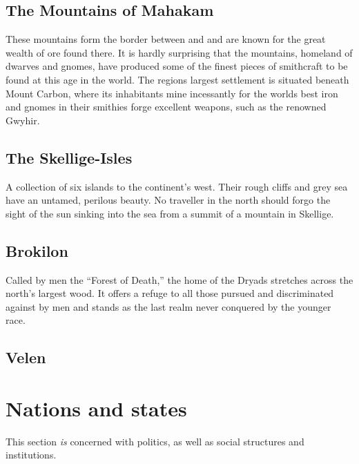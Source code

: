\documentclass[parskip=full,11pt,%
footheight=38pt]{scrreport}
\begin{document}
\subsection{The Mountains of Mahakam}\label{region:mahakamMtns}
These mountains form the border between  and  and are known for the great wealth
of ore found there. It is hardly surprising that the mountains, homeland of dwarves and gnomes, have produced some of the finest
pieces of smithcraft to be found at this age in the world. The regions largest settlement is situated beneath Mount Carbon,
where its inhabitants mine incessantly for the worlds best iron and gnomes in their smithies forge excellent weapons, such as
the renowned Gwyhir.

\subsection{The Skellige-Isles}\label{region:skellige}
A collection of six islands to the continent's west. Their rough cliffs and grey sea have an untamed, perilous beauty.
No traveller in the north should forgo the sight of the sun sinking into the sea from a summit of a mountain in Skellige.

\subsection{Brokilon}\label{region:brokilon}
Called by men the ``Forest of Death,'' the home of the Dryads stretches across the north's largest wood. It offers a refuge to
all those pursued and discriminated against by men and stands as the last realm never conquered by the younger race.

\subsection{Velen}\label{region:velen}

\newpage

\section{Nations and states}
This section \textit{is} concerned with politics, as well as social structures and institutions.




\end{document}
